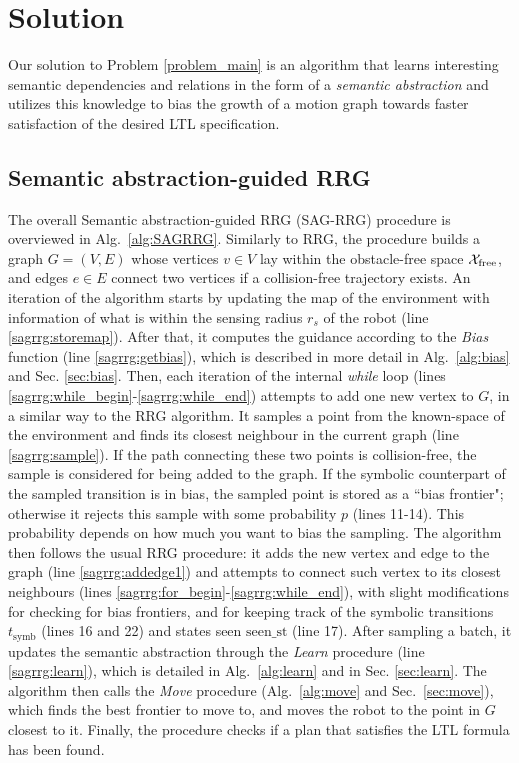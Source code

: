 \section{Solution}\label{sec:sol}
Our solution to Problem \ref{problem_main} is an algorithm that learns interesting semantic dependencies and relations in the form of a \emph{semantic abstraction} and utilizes this knowledge to bias the growth of a motion graph towards faster satisfaction of the desired LTL specification.

\subsection{Semantic abstraction-guided RRG} 

The overall Semantic abstraction-guided RRG (SAG-RRG) procedure is overviewed in Alg.~\ref{alg:SAGRRG}.
Similarly to RRG, the procedure builds a graph $G=(V,E)$ whose vertices $v \in V$ lay within the obstacle-free space $\mathcal{X}_{\text{free}}$, and edges $e \in E$ connect two vertices if a collision-free trajectory exists. 
An iteration of the algorithm starts by updating the map of the environment with information of what is within the sensing radius $r_s$ of the robot (line \ref{sagrrg:storemap}). 
After that, it computes the guidance according to the \emph{Bias} function (line \ref{sagrrg:getbias}), which is described in more detail in Alg.~\ref{alg:bias} and Sec. \ref{sec:bias}.
Then, each iteration of the internal \emph{while} loop (lines \ref{sagrrg:while_begin}-\ref{sagrrg:while_end}) attempts to add one new vertex to $G$, in a similar way to the RRG algorithm. It samples a point from the known-space of the environment and finds its closest neighbour in the current graph (line \ref{sagrrg:sample}).
If the path connecting these two points is collision-free, the sample is considered for being added to the graph.
If the symbolic counterpart of the sampled transition is in bias, the sampled point is stored as a ``bias frontier";
otherwise it rejects this sample with some probability $p$ (lines 11-14). This probability depends on how much you want to bias the sampling.
The algorithm then follows the usual RRG procedure: it adds the new vertex and edge to the graph (line \ref{sagrrg:addedge1}) and attempts to connect such vertex to its closest neighbours (lines \ref{sagrrg:for_begin}-\ref{sagrrg:while_end}), with slight modifications  for checking for bias frontiers, and for keeping track of the symbolic transitions $t_\mathrm{symb}$ (lines 16 and 22) and states seen $\mathrm{seen\_st}$ (line 17).
After sampling a batch, it updates the semantic abstraction through the \emph{Learn} procedure (line \ref{sagrrg:learn}), which is detailed in Alg.~\ref{alg:learn} and in Sec. \ref{sec:learn}.
The algorithm then calls the \emph{Move} procedure (Alg.~\ref{alg:move} and Sec.~\ref{sec:move}), which finds the best frontier to move to, and moves the robot to the point in $G$ closest to it.
Finally, the procedure checks if a plan that satisfies the LTL formula has been found. 

